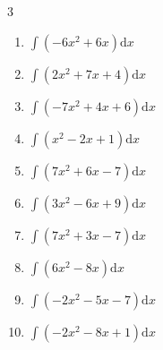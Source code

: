 \begin{multicols}{3}
\begin{enumerate}

\columnbreak %

  \item $\displaystyle \int \left( -6x^{2}+6x \right) \mathrm{d}x$


  \item $\displaystyle \int \left( 2x^{2}+7x+4 \right) \mathrm{d}x$


  \item $\displaystyle \int \left( -7x^{2}+4x+6 \right) \mathrm{d}x$


  \item $\displaystyle \int \left( x^{2}-2x+1 \right) \mathrm{d}x$


  \item $\displaystyle \int \left( 7x^{2}+6x-7 \right) \mathrm{d}x$


  \item $\displaystyle \int \left( 3x^{2}-6x+9 \right) \mathrm{d}x$


  \item $\displaystyle \int \left( 7x^{2}+3x-7 \right) \mathrm{d}x$


  \item $\displaystyle \int \left( 6x^{2}-8x \right) \mathrm{d}x$


  \item $\displaystyle \int \left( -2x^{2}-5x-7 \right) \mathrm{d}x$


  \item $\displaystyle \int \left( -2x^{2}-8x+1 \right) \mathrm{d}x$


\end{enumerate}
\end{multicols}
